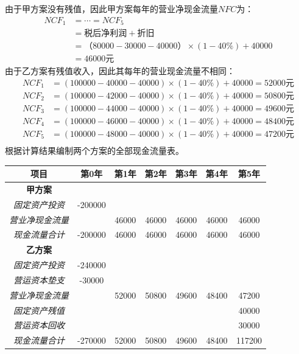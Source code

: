 \documentclass[
  10pt,
  twoside,
  openany,
  b5paper, %
  colorscheme = black, %
  xits = false,
]{qyxf-book}
\begin{document}
\begin{note}
	由于甲方案没有残值，因此甲方案每年的营业净现金流量$NFC$为：
	\begin{equation*}
		\begin{aligned}
			NCF_1 &= \cdots = NCF_5 \\
			&= \text{税后净利润} + {折旧} \\
			&= （80000-30000-40000）\times (1-40\%) + 40000 \\
			&= 46000 \text{元}
		\end{aligned}
	\end{equation*}
	由于乙方案有残值收入，因此其每年的营业现金流量不相同：
	\begin{equation*}
		\begin{aligned}
			NCF_1 &= (100000-40000-40000) \times (1-40\%) + 40000 = 52000\text{元} \\
			NCF_2 &= (100000-42000-40000) \times (1-40\%) +40000 =50800 \text{元} \\
			NCF_3 &= (100000-44000-40000) \times (1-40\%) +40000 =49600 \text{元} \\
			NCF_4 &= (100000-46000-40000) \times (1-40\%) +40000 =48400 \text{元} \\
			NCF_5 &= (100000-48000-40000) \times (1-40\%) +40000 =47200 \text{元} \\
		\end{aligned}
	\end{equation*}
	根据计算结果编制两个方案的全部现金流量表。
	\begin{center}
		\begin{tabular}{ccccccc}
			\toprule
			项目 & 第0年 & 第1年 & 第2年 & 第3年 & 第4年 & 第5年 \\
			\midrule
			\textbf{甲方案} &  & & & & & \\
			\emph{固定资产投资} & -200000 & & & & & \\
			\emph{营业净现金流量} & & 46000 & 46000 & 46000 & 46000 & 46000\\
			\emph{现金流量合计} & -200000 & 46000 & 46000 & 46000 & 46000 & 46000\\
			\textbf{乙方案}  & & & & & & \\ 
			\emph{固定资产投资} & -240000 & & & & & \\
			\emph{营运资本垫支} & -30000 & & & & & \\
			\emph{营业净现金流量} & & 52000 & 50800 & 49600 & 48400 & 47200\\
			\emph{固定资产残值} &  & & & & & 40000 \\
			\emph{营运资本回收} & & & & & & 30000 \\
			\emph{现金流量合计} & -270000 & 52000 & 50800 & 49600 & 48400 & 117200\\
			\bottomrule
		\end{tabular}
	\end{center}

\end{note}
\end{document}
